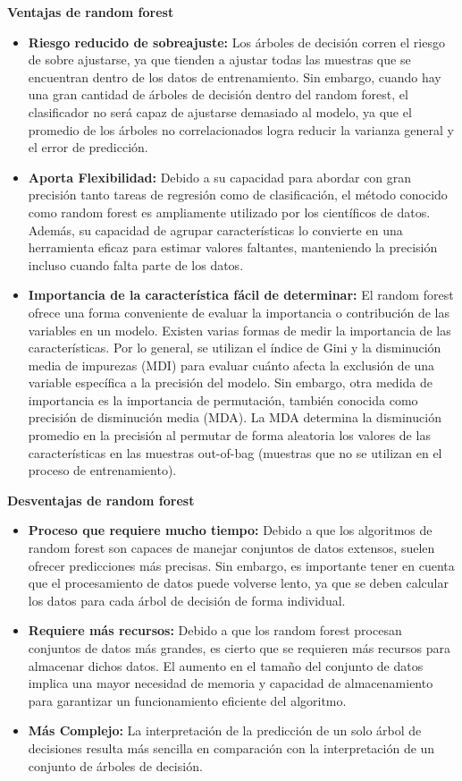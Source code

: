 \textbf{Ventajas de random forest}
\begin{itemize}
    \item \textbf{Riesgo reducido de sobreajuste:} Los árboles de decisión corren el riesgo de sobre ajustarse, ya que tienden a ajustar todas las muestras que se encuentran dentro de los datos de entrenamiento. Sin embargo, cuando hay una gran cantidad de árboles de decisión dentro del random forest, el clasificador no será capaz de ajustarse demasiado al modelo, ya que el promedio de los árboles no correlacionados logra reducir la varianza general y el error de predicción.
    \item \textbf{Aporta Flexibilidad:} Debido a su capacidad para abordar con gran precisión tanto tareas de regresión como de clasificación, el método conocido como random forest es ampliamente utilizado por los científicos de datos. Además, su capacidad de agrupar características lo convierte en una herramienta eficaz para estimar valores faltantes, manteniendo la precisión incluso cuando falta parte de los datos.
    \item \textbf{Importancia de la característica fácil de determinar:} El random forest ofrece una forma conveniente de evaluar la importancia o contribución de las variables en un modelo. Existen varias formas de medir la importancia de las características. Por lo general, se utilizan el índice de Gini y la disminución media de impurezas (MDI) para evaluar cuánto afecta la exclusión de una variable específica a la precisión del modelo.
    Sin embargo, otra medida de importancia es la importancia de permutación, también conocida como precisión de disminución media (MDA). La MDA determina la disminución promedio en la precisión al permutar de forma aleatoria los valores de las características en las muestras out-of-bag (muestras que no se utilizan en el proceso de entrenamiento).
\end{itemize}

\textbf{Desventajas de random forest}
\begin{itemize}
    \item \textbf{Proceso que requiere mucho tiempo:} Debido a que los algoritmos de random forest son capaces de manejar conjuntos de datos extensos, suelen ofrecer predicciones más precisas. Sin embargo, es importante tener en cuenta que el procesamiento de datos puede volverse lento, ya que se deben calcular los datos para cada árbol de decisión de forma individual.  
    \item \textbf{Requiere más recursos:} Debido a que los random forest procesan conjuntos de datos más grandes, es cierto que se requieren más recursos para almacenar dichos datos. El aumento en el tamaño del conjunto de datos implica una mayor necesidad de memoria y capacidad de almacenamiento para garantizar un funcionamiento eficiente del algoritmo.    
    \item \textbf{Más Complejo:} La interpretación de la predicción de un solo árbol de decisiones resulta más sencilla en comparación con la interpretación de un conjunto de árboles de decisión.
\end{itemize}